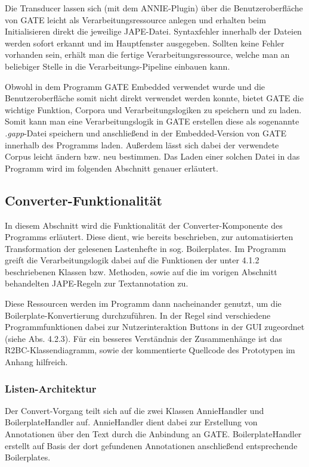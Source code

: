 \documentclass[12pt]{report}
\begin{document}
Die Transducer lassen sich (mit dem ANNIE-Plugin) über die Benutzeroberfläche von GATE leicht als Verarbeitungsressource anlegen und erhalten beim Initialisieren direkt die jeweilige JAPE-Datei. Syntaxfehler innerhalb der Dateien werden sofort erkannt und im Hauptfenster ausgegeben. 
Sollten keine Fehler vorhanden sein, erhält man die fertige Verarbeitungsressource, welche man an beliebiger Stelle in die Verarbeitungs-Pipeline einbauen kann.

Obwohl in dem Programm GATE Embedded verwendet wurde und die Benutzeroberfläche somit nicht direkt verwendet werden konnte, bietet GATE die wichtige Funktion, Corpora und Verarbeitungslogiken zu speichern und zu laden. Somit kann man eine Verarbeitungslogik in GATE erstellen diese als sogenannte \textit{.gapp}-Datei speichern und anschließend in der Embedded-Version von GATE innerhalb des Programms laden. Außerdem lässt sich dabei der verwendete Corpus leicht ändern bzw. neu bestimmen. Das Laden einer solchen Datei in das Programm wird im folgenden Abschnitt genauer erläutert. 

\subsection{Converter-Funktionalität}
In diesem Abschnitt wird die Funktionalität der Converter-Komponente des Programms erläutert. Diese dient, wie bereits beschrieben, zur automatisierten Transformation der gelesenen Lastenhefte in sog. Boilerplates. Im Programm greift die Verarbeitungslogik dabei auf die Funktionen der unter 4.1.2 beschriebenen Klassen bzw. Methoden, sowie auf die im vorigen Abschnitt behandelten JAPE-Regeln zur Textannotation zu. 

Diese Ressourcen werden im Programm dann nacheinander genutzt, um die Boilerplate-Konvertierung durchzuführen. In der Regel sind verschiedene Programmfunktionen dabei zur Nutzerinteraktion Buttons in der GUI zugeordnet (siehe Abs. 4.2.3). Für ein besseres Verständnis der Zusammenhänge ist das R2BC-Klassendiagramm, sowie der kommentierte Quellcode des Prototypen im Anhang hilfreich.

\subsubsection{Listen-Architektur}
Der Convert-Vorgang teilt sich auf die zwei Klassen AnnieHandler und BoilerplateHandler auf. AnnieHandler dient dabei zur Erstellung von Annotationen über den Text durch die Anbindung an GATE. BoilerplateHandler erstellt auf Basis der dort gefundenen Annotationen anschließend entsprechende Boilerplates. 
\end{document}

